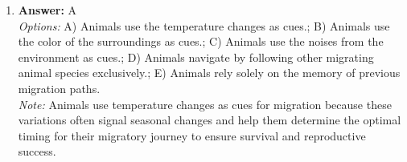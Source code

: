 \documentclass[12pt]{article}
\begin{document}
\begin{enumerate}[label=\arabic*.]
\\ \textit{Options:} A) Oxygen is used to maintain the temperature of cells.; B) Oxygen is used by cells to produce alcohol.; C) Oxygen is used to produce carbon dioxide in cells.; D) Oxygen is solely responsible for stimulating brain activity.; E) Oxygen is used to synthesize proteins in cells.
\\ \textit{Note:} Oxygen plays a crucial role in cellular respiration, a process that generates the energy needed for maintaining cellular functions and regulating temperature in the body.
\item \textbf{Answer:} A
\\ \textit{Options:} A) Animals use the temperature changes as cues.; B) Animals use the color of the surroundings as cues.; C) Animals use the noises from the environment as cues.; D) Animals navigate by following other migrating animal species exclusively.; E) Animals rely solely on the memory of previous migration paths.
\\ \textit{Note:} Animals use temperature changes as cues for migration because these variations often signal seasonal changes and help them determine the optimal timing for their migratory journey to ensure survival and reproductive success.
\end{enumerate}
\end{document}
